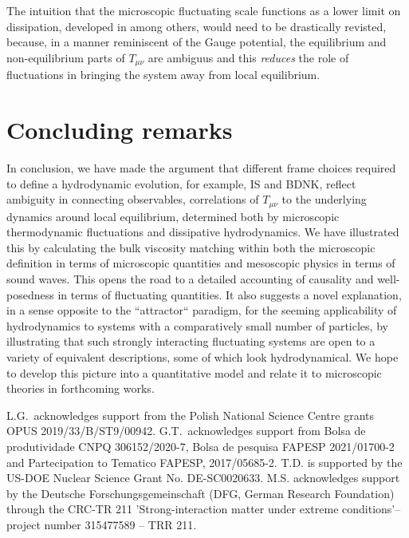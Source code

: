 \documentclass[12pt,onecolumn,showpacs,amssymb,aps,nofootinbib,floatfix]{revtex4-2}
\begin{document}
	The intuition that the microscopic fluctuating scale functions as a lower limit on dissipation, developed in \cite{stick,ryblewski} among others, would need to be drastically revisted, because, in a manner reminiscent of the Gauge potential, the equilibrium and non-equilibrium parts of $T_{\mu \nu}$ are ambiguus and this {\em reduces} the role of fluctuations in bringing the system away from local equilibrium.
	\section{Concluding remarks}\label{sec:conclusion}
	In conclusion, we have made the argument that different frame choices required to define a hydrodynamic evolution, for example, IS and BDNK, reflect ambiguity in connecting observables, correlations of $T_{\mu \nu}$ to the underlying dynamics around local equilibrium, determined both by microscopic thermodynamic fluctuations and dissipative hydrodynamics. We have illustrated this by calculating the bulk viscosity matching within both the microscopic definition in terms of microscopic quantities and mesoscopic physics in terms of sound waves.
	This opens the road to a detailed accounting of causality and well-posedness in terms of fluctuating quantities.   \color{black}It also suggests a novel explanation, in a sense opposite to the ``attractor`` paradigm, for the seeming applicability of hydrodynamics to systems with a comparatively small number of particles, by illustrating that such strongly interacting fluctuating systems are open to a variety of equivalent descriptions, some of which look hydrodynamical.
We hope to develop this picture into a quantitative model and relate it to microscopic theories in forthcoming works. \color{black}
	
	
	L.G.~acknowledges support from the Polish National Science Centre grants OPUS 2019/33/B/ST9/00942. G.T.~acknowledges support from Bolsa de produtividade CNPQ 306152/2020-7, Bolsa de pesquisa FAPESP 2021/01700-2 and Partecipation to Tematico FAPESP, 2017/05685-2. T.D. is supported by the US-DOE Nuclear Science Grant No. DE-SC0020633.	 M.S. acknowledges support by the Deutsche Forschungsgemeinschaft (DFG, German Research Foundation) through the CRC-TR 211 'Strong-interaction matter under extreme conditions'– project number 315477589 – TRR 211.
\appendix
\end{document}
